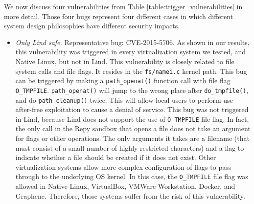 We now discuss four vulnerabilities from Table \ref{table:trigger_vulnerabilities}
in more detail. Those four bugs represent four different cases in which
different system design philosophies have different security impacts.

\begin{itemize}
\item \emph{Only Lind safe.}  Representative bug: CVE-2015-5706. As
shown in our results, this vulnerability was triggered in every
virtualization system we tested, and Native Linux, but not in Lind. This vulnerability
is closely related to file system calls and file flags. It resides in the \texttt{fs/namei.c}
kernel path. This bug can be triggered by making a \texttt{path\_openat()} function
call with file flag \texttt{O\_TMPFILE}. \texttt{path\_openat()} will jump to the wrong
place after \texttt{do\_tmpfile()}, and do \texttt{path\_cleanup()} twice. This will
allow local users to perform use-after-free exploitation to cause a denial of service.
This bug was not triggered in Lind, because Lind does not support the use of
\texttt{O\_TMPFILE} file flag. In fact, the only call in the Repy sandbox that
opens a file does not take an argument for flags or other operations.  The
only arguments it takes are a filename (that must consist of a small number
of highly restricted characters) and a flag to indicate whether a file should
be created if it does not exist.
Other virtualization systems allow more complex configuration of flags to
pass through to the underlying OS kernel.   
In this case, the \texttt{O\_TMPFILE} file flag was
allowed in Native Linux, VirtualBox, VMWare Workstation, Docker, and Graphene. Therefore,
those systems suffer from the risk of this vulnerability.


\end{itemize}

